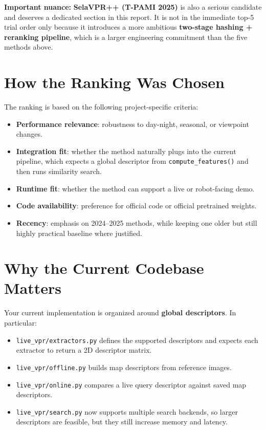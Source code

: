 \documentclass[11pt]{article}
\begin{document}
\textbf{Important nuance:} \textbf{SelaVPR++ (T-PAMI 2025)} is also a serious candidate and deserves a dedicated section in this report. It is not in the immediate top-5 trial order only because it introduces a more ambitious \textbf{two-stage hashing + reranking pipeline}, which is a larger engineering commitment than the five methods above.

\section*{How the Ranking Was Chosen}
The ranking is based on the following project-specific criteria:
\begin{itemize}[leftmargin=*]
  \item \textbf{Performance relevance}: robustness to day-night, seasonal, or viewpoint changes.
  \item \textbf{Integration fit}: whether the method naturally plugs into the current pipeline, which expects a global descriptor from \texttt{compute\_features()} and then runs similarity search.
  \item \textbf{Runtime fit}: whether the method can support a live or robot-facing demo.
  \item \textbf{Code availability}: preference for official code or official pretrained weights.
  \item \textbf{Recency}: emphasis on 2024--2025 methods, while keeping one older but still highly practical baseline where justified.
\end{itemize}

\section*{Why the Current Codebase Matters}
Your current implementation is organized around \textbf{global descriptors}. In particular:
\begin{itemize}[leftmargin=*]
  \item \texttt{live\_vpr/extractors.py} defines the supported descriptors and expects each extractor to return a 2D descriptor matrix.
  \item \texttt{live\_vpr/offline.py} builds map descriptors from reference images.
  \item \texttt{live\_vpr/online.py} compares a live query descriptor against saved map descriptors.
  \item \texttt{live\_vpr/search.py} now supports multiple search backends, so larger descriptors are feasible, but they still increase memory and latency.
\end{itemize}
\end{document}
